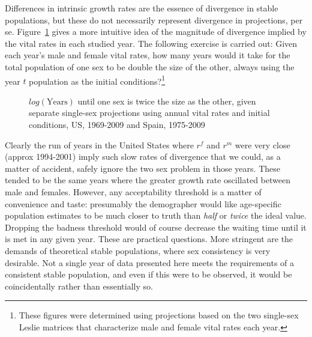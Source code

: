  \FloatBarrier
\label{sec:ageSRdoubling}
Differences in intrinsic growth rates are the essence of divergence in
stable populations, but these do not necessarily represent divergence in
projections, per se. Figure~\ref{fig:rSRdoubling} gives a more intuitive idea of
the magnitude of divergence implied by the vital rates in each studied year. The following
 exercise is carried out: Given each year's male and
female vital rates, how many years would it take for the total population of one
sex to be double the size of the other, always using the year $t$ population as
the initial conditions?\footnote{These figures were determined using projections
based on the two single-sex Leslie matrices that characterize male and female
vital rates each year.}

\begin{figure}[ht!]
        \centering  
          \caption{$log(\mathrm{Years})$ until one sex is twice the size as the
          other, given separate single-sex projections using annual vital rates and initial
          conditions, US, 1969-2009 and Spain, 1975-2009}
           \quad
          \label{fig:rSRdoubling}
\end{figure}

Clearly the run of years in the United States where $r^f$ and $r^m$ were very
close (approx 1994-2001) imply such slow rates of divergence that we could, as a
matter of accident, safely ignore the two sex problem in those years. These
tended to be the same years where the greater growth rate oscillated between
male and females. However, any acceptability threshold is a matter of
convenience and taste: presumably the demographer would like age-specific 
population estimates to be much closer to truth than \textit{half} or \textit{twice} the ideal value.
Dropping the badness threshold would of course decrease the waiting time until
it is met in any given year. These are practical questions. More
stringent are the demands of theoretical stable populations, where
sex consistency is very desirable. Not a single year of data presented here
meets the requirements of a consistent stable population, and even if this were
to be observed, it would be coincidentally rather than essentially so. 
